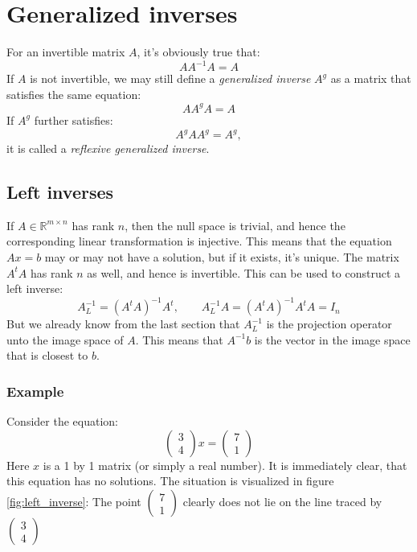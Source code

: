 \documentclass[12pt, a4paper]{article}
\numberwithin{equation}{section}
\begin{document}
\section{Generalized inverses}
For an invertible matrix $A$, it's obviously true that:
\begin{equation}
AA^{-1} A=A
\end{equation}
If $A$ is not invertible, we may still define a \textit{generalized inverse} $A^g$ as a matrix that satisfies the same equation:
\begin{equation}
\label{generalized_inverse}
AA^g A=A
\end{equation}
If $A^g$ further satisfies:
\begin{equation}
\label{reflexive_generalized_inverse}
A^g AA^g=A^g,
\end{equation}
it is called a \textit{reflexive generalized inverse}.

\subsection{Left inverses}
If $A\in\mathbb{R}^{m\times n}$ has rank $n$, then the null space is trivial, and hence the corresponding linear transformation is injective. This means that the equation $Ax=b$ may or may not have a solution, but if it exists, it's unique. The matrix $A^tA$ has rank $n$ as well, and hence is invertible. This can be used to construct a left inverse:
\begin{equation}
A^{-1}_L=(A^t A)^{-1}A^t,\qquad A^{-1}_L A=(A^t A)^{-1}A^t A=I_n
\end{equation}
But we already know from the last section that $A^{-1}_L$ is the projection operator unto the image space of $A$. This means that $A^{-1}b$ is the vector in the image space that is closest to $b$. 

\subsubsection{Example}
Consider the equation:
\begin{equation}
\label{impossible_equation}
\begin{pmatrix}
3 \\ 4
\end{pmatrix}
x=
\begin{pmatrix}
7 \\ 1
\end{pmatrix}
\end{equation}
Here $x$ is a 1 by 1 matrix (or simply a real number). It is immediately clear, that this equation has no solutions. The situation is visualized in figure \ref{fig:left_inverse}: The point $\begin{pmatrix}7 \\ 1\end{pmatrix}$ clearly does not lie on the line traced by $\begin{pmatrix}3 \\ 4\end{pmatrix}$
\end{document}

